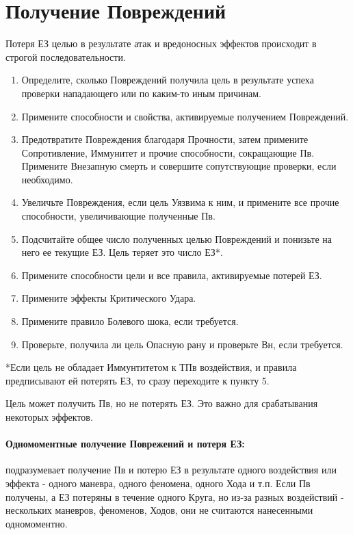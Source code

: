\section{Получение Повреждений}
Потеря ЕЗ целью в результате атак и вредоносных эффектов происходит в строгой последовательности.
\begin{enumerate}
  \item Определите, сколько Повреждений получила цель в результате успеха проверки нападающего или по каким-то иным причинам.
  \item Примените способности и свойства, активируемые получением Повреждений.
  \item Предотвратите Повреждения благодаря Прочности, затем примените Сопротивление, Иммунитет и прочие способности, сокращающие Пв. Примените Внезапную смерть и совершите сопутствующие проверки, если необходимо.
  \item Увеличьте Повреждения, если цель Уязвима к ним, и примените все прочие способности, увеличивающие полученные Пв.
  \item Подсчитайте общее число полученных целью Повреждений и понизьте на него ее текущие ЕЗ. Цель теряет это число ЕЗ*.
  \item Примените способности цели и все правила, активируемые потерей ЕЗ.
  \item Примените эффекты Критического Удара.
  \item Примените правило Болевого шока, если требуется.
  \item Проверьте, получила ли цель Опасную рану и проверьте Вн, если требуется.
\end{enumerate}
*Если цель не обладает Иммунтитетом к ТПв воздействия, и правила предписывают ей потерять ЕЗ, то сразу переходите к пункту 5. 
\begin{tcolorbox}
  Цель может получить Пв, но не потерять ЕЗ. Это важно для срабатывания некоторых эффектов.
\end{tcolorbox}

\paragraph{Одномоментные получение Поврежений и потеря ЕЗ:} подразумевает получение Пв и потерю ЕЗ в результате одного воздействия или эффекта - одного маневра, одного феномена, одного Хода и т.п. Если Пв получены, а ЕЗ потеряны в течение одного Круга, но из-за разных воздействий - нескольких маневров, феноменов, Ходов, они не считаются нанесенными одномоментно.

